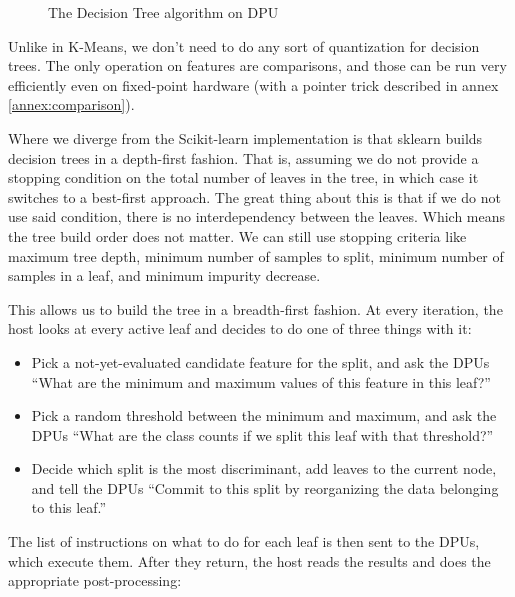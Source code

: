 \begin{figure}
{
    }
    \caption{\label{fig:TreesDPU}The Decision Tree algorithm on DPU}
\end{figure}

Unlike in K-Means, we don't need to do any sort of quantization for decision trees. The only operation on features are comparisons, and those can be run very efficiently even on fixed-point hardware (with a pointer trick described in annex \ref{annex:comparison}).

Where we diverge from the Scikit-learn implementation is that sklearn builds decision trees in a depth-first fashion. That is, assuming we do not provide a stopping condition on the total number of leaves in the tree, in which case it switches to a best-first approach. The great thing about this is that if we do not use said condition, there is no interdependency between the leaves. Which means the tree build order does not matter. We can still use stopping criteria like maximum tree depth, minimum number of samples to split, minimum number of samples in a leaf, and minimum impurity decrease.

This allows us to build the tree in a breadth-first fashion. At every iteration, the host looks at every active leaf and decides to do one of three things with it:

\begin{itemize}
    \item Pick a not-yet-evaluated candidate feature for the split, and ask the DPUs ``What are the minimum and maximum values of this feature in this leaf?''
    \item Pick a random threshold between the minimum and maximum, and ask the DPUs ``What are the class counts if we split this leaf with that threshold?''
    \item Decide which split is the most discriminant, add leaves to the current node, and tell the DPUs ``Commit to this split by reorganizing the data belonging to this leaf.''
\end{itemize}

The list of instructions on what to do for each leaf is then sent to the DPUs, which execute them. After they return, the host reads the results and does the appropriate post-processing:

